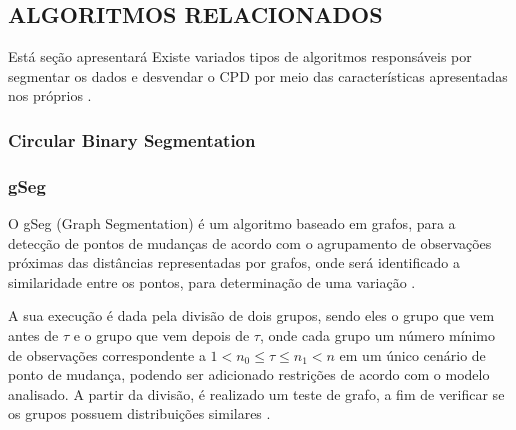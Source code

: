 


\subsection{ALGORITMOS RELACIONADOS}

Está seção apresentará 
Existe variados tipos de algoritmos responsáveis por segmentar os dados e desvendar o CPD por meio das características apresentadas nos próprios \cite{Aminikhanghahi2017}.


\subsubsection{Circular Binary Segmentation}

\subsubsection{gSeg}

O gSeg (Graph Segmentation) é um algoritmo baseado em grafos, para a detecção de pontos de mudanças de acordo com o agrupamento de observações próximas das distâncias representadas por grafos, onde será identificado a similaridade entre os pontos, para determinação de uma variação 
\cite{Chen2015}. 

A sua execução é dada pela divisão de dois grupos, sendo eles o grupo que vem antes de $\tau$ e o grupo que vem depois de $\tau$, onde cada grupo um número mínimo de observações correspondente a $1 < n_{0} \leq \tau \leq n_{1} < n$ em um único cenário de ponto de mudança, podendo ser adicionado restrições de acordo com o modelo analisado. A partir da divisão, é realizado um teste de grafo, a fim de verificar se os grupos possuem distribuições similares \cite{Chen2015}. 


